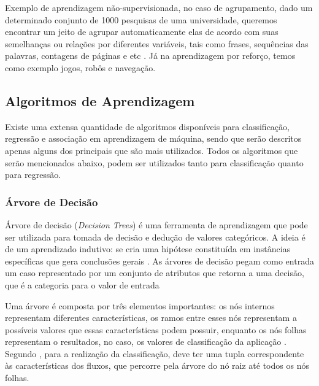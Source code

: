 \par
Exemplo de aprendizagem não-supervisionada, no caso de agrupamento, dado um determinado conjunto de 1000 pesquisas de uma universidade, queremos encontrar um jeito de agrupar automaticamente elas de acordo com suas semelhanças ou relações por diferentes variáveis, tais como frases, sequências das palavras, contagens de páginas e etc \cite{Pedro}. Já na aprendizagem por reforço, temos como exemplo jogos, robôs e navegação.


\subsection{Algoritmos de Aprendizagem}

\par
Existe uma extensa quantidade de algoritmos disponíveis para classificação, regressão e associação em aprendizagem de máquina, sendo que serão descritos apenas alguns dos principais que são mais utilizados. Todos os algoritmos que serão mencionados abaixo, podem ser utilizados tanto para classificação quanto para regressão. %


\subsubsection{Árvore de Decisão}

\par
Árvore de decisão (\textit{Decision Trees}) é uma ferramenta de aprendizagem que pode ser utilizada para tomada de decisão e dedução de valores categóricos. A ideia é de um aprendizado indutivo: se cria uma hipótese constituída em instâncias específicas que gera conclusões gerais \cite{Marques2014}. As árvores de decisão pegam como entrada um caso representado por um conjunto de atributos que retorna a uma decisão, que é a categoria para o valor de entrada


\par
Uma árvore é composta por três elementos importantes: os nós internos representam diferentes características, os ramos entre esses nós representam a possíveis valores que essas características podem possuir, enquanto os nós folhas representam o resultados, no caso, os valores de classificação da aplicação \cite{Henke2011, Barros2012}. Segundo , para a realização da classificação, deve ter uma tupla correspondente às características dos fluxos, que percorre pela árvore do nó raiz até  todos os nós folhas.  

